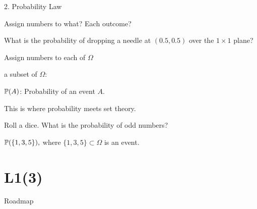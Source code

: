 \begin{frame}{2. Probability Law}

\plitemsep 0.1in

\bci [$\bullet$]

\item<2-> Assign numbers to what? Each outcome?

\item<3-> What is the probability of dropping a needle at $(0.5, 0.5)$ over the $1\times 1$ plane? 

\item<4-> Assign numbers to each  of $\Omega$

\item<6-> a subset of $\Omega$: 

\item<8-> $\mathbb{P}( A )$: Probability of an event $A.$

\bci
\item This is where probability meets set theory.  
\eci

\item<9-> Roll a dice. What is the probability of odd numbers?

\medskip
$
\mathbb{P}(  \{1,3,5 \} ),
$
where $\{1,3,5 \} \subset \Omega$ is an event.
\eci

\end{frame}

\section{L1(3)}
\begin{frame}{Roadmap}
\bce[(1)]
\item {}

\item {}

\item {}
\ece
\end{frame}


